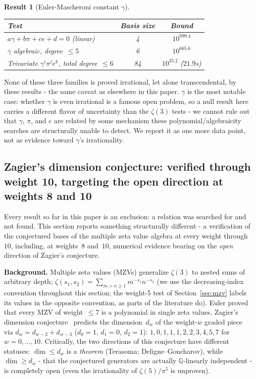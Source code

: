 \documentclass[12pt]{article}
\newtheorem{result}[theorem]{Result}
\theoremstyle{definition}
\theoremstyle{remark}
\newcommand{\Q}{\mathbb{Q}}
\begin{document}
\begin{result}[Euler-Mascheroni constant $\gamma$]\label{res:new-gamma}
\begin{center}
\begin{tabular}{@{}lcc@{}}
\toprule
Test & Basis size & Bound \\
\midrule
$a\gamma+b\pi+ce+d=0$ (linear) & 4 & $10^{999.4}$ \\
$\gamma$ algebraic, degree~$\le 5$ & 6 & $10^{665.6}$ \\
Trivariate $\gamma^i\pi^je^k$, total degree~$\le 6$ & 84 & $10^{35.2}$ ($21.9$s) \\
\bottomrule
\end{tabular}
\end{center}
\end{result}

\noindent None of these three families is proved irrational, let
alone transcendental, by these results - the same caveat as
elsewhere in this paper.  $\gamma$ is the most notable case: whether
$\gamma$ is even irrational is a famous open problem, so a null
result here carries a different flavor of uncertainty than the
$\zeta(3)$ tests - we cannot rule out that $\gamma$, $\pi$, and $e$
are related by some mechanism these polynomial/algebraicity searches
are structurally unable to detect.  We report it as one more data
point, not as evidence toward $\gamma$'s irrationality.

\subsection{Zagier's dimension conjecture: verified through weight 10,
targeting the open direction at weights 8 and 10}\label{sec:zagier}

Every result so far in this paper is an exclusion: a relation was
searched for and not found.  This section reports something
structurally different - a verification of the conjectured bases of
the multiple zeta value algebra at every weight through~$10$,
including, at weights~$8$ and~$10$, numerical evidence bearing on the
\emph{open} direction of Zagier's conjecture.

\textbf{Background.}  Multiple zeta values (MZVs) generalize
$\zeta(3)$ to nested sums of arbitrary depth;
$\zeta(s_1,s_2)=\sum_{m>n\ge 1} m^{-s_1}n^{-s_2}$ (we use the
decreasing-index convention throughout this section; the weight-5
test of Section~\ref{sec:mzv} labels its values in the opposite
convention, as parts of the literature do).  Euler proved that every
MZV of weight~$\le 7$ is a polynomial in single zeta values.
Zagier's dimension conjecture~\cite{Zagier1994} predicts the
dimension~$d_w$ of the weight-$w$ graded piece via
$d_w = d_{w-2}+d_{w-3}$ ($d_0=1$, $d_1=0$, $d_2=1$):
$1,0,1,1,1,2,2,3,4,5,7$ for $w=0,\ldots,10$.  Critically, the two
directions of this conjecture have different statuses:
$\dim \le d_w$ is a \emph{theorem} (Terasoma; Deligne--Goncharov),
while $\dim \ge d_w$ - that the conjectured generators are actually
$\Q$-linearly independent - is completely open (even the
irrationality of $\zeta(5)/\pi^5$ is unproven).
\end{document}

